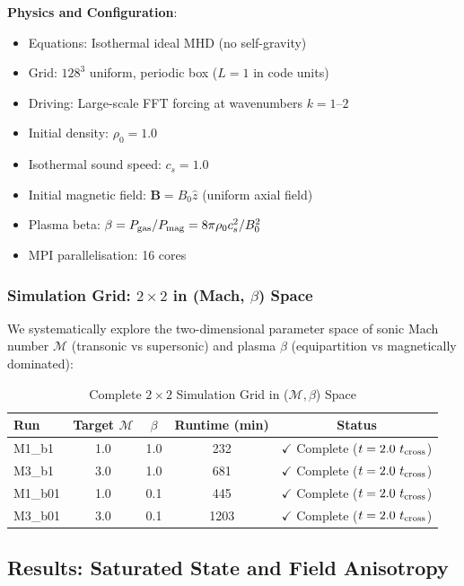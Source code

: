 \documentclass[11pt,a4paper]{article}
\begin{document}
\textbf{Physics and Configuration}:
\begin{itemize}
    \item Equations: Isothermal ideal MHD (no self-gravity)
    \item Grid: $128^3$ uniform, periodic box ($L = 1$ in code units)
    \item Driving: Large-scale FFT forcing at wavenumbers $k = 1$--$2$
    \item Initial density: $\rho_0 = 1.0$
    \item Isothermal sound speed: $c_s = 1.0$
    \item Initial magnetic field: $\mathbf{B} = B_0 \hat{z}$ (uniform axial field)
    \item Plasma beta: $\beta = P_{\rm gas}/P_{\rm mag} = 8\pi\rho_0 c_s^2/B_0^2$
    \item MPI parallelisation: 16 cores
\end{itemize}

\subsubsection{Simulation Grid: $2\times2$ in (Mach, $\beta$) Space}

We systematically explore the two-dimensional parameter space of sonic Mach number $\mathcal{M}$ (transonic vs supersonic) and plasma $\beta$ (equipartition vs magnetically dominated):

\begin{table}[H]
\centering
\caption{Complete $2\times2$ Simulation Grid in ($\mathcal{M}, \beta$) Space}
\begin{tabular}{lcccc}
\toprule
Run & Target $\mathcal{M}$ & $\beta$ & Runtime (min) & Status \\
\midrule
M1\_b1  & 1.0 & 1.0 & 232  & $\checkmark$ Complete ($t = 2.0~t_{\rm cross}$) \\
M3\_b1  & 3.0 & 1.0 & 681  & $\checkmark$ Complete ($t = 2.0~t_{\rm cross}$) \\
M1\_b01 & 1.0 & 0.1 & 445  & $\checkmark$ Complete ($t = 2.0~t_{\rm cross}$) \\
M3\_b01 & 3.0 & 0.1 & 1203 & $\checkmark$ Complete ($t = 2.0~t_{\rm cross}$) \\
\bottomrule
\end{tabular}
\end{table}

\subsection{Results: Saturated State and Field Anisotropy}
\end{document}
